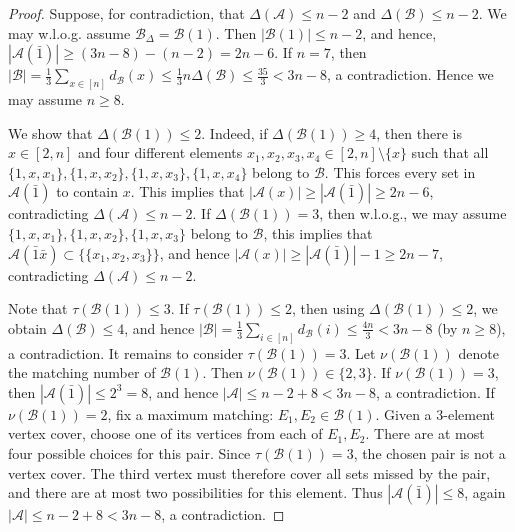 \documentclass[a4paper,11pt]{article}
\newcommand{\m}{\mathcal}
\begin{document}
\begin{proof}
Suppose, for contradiction, that $\Delta(\m A)\le n-2$ and $\Delta(\m B)\le n-2$.
We may w.l.o.g. assume $\m B_{\Delta}=\m B(1)$. Then $|\m B(1)|\le n-2$, and hence, $|\m A(\bar1)|\ge(3n-8)-(n-2)=2n-6.$ 
If $n=7$, then $|\m B|=\frac{1}{3}\sum_{x\in[n]}d_{\m B}(x)\le \frac{1}{3}n\Delta(\m B)\le \frac{35}{3}<3n-8$, a contradiction. Hence we may assume $n\ge8$. 

We show that $\Delta(\m B(1))\le 2$. Indeed, if $\Delta(\m B(1))\ge 4$, then  there is $x\in [2,n]$ and four different elements $x_1,x_2,x_3, x_4\in [2,n]\setminus \{x\}$ such that all $\{1,x,x_1\}, \{1,x,x_2\}, \{1,x,x_3\}, \{1,x,x_4\}$ belong to $\m B$. This forces every set in $\m A(\bar1)$ to contain $x$. This implies that $|\m A(x)|\ge|\m A(\bar1)|\ge 2n-6$, contradicting $\Delta(\m A)\le n-2$. If $\Delta(\m B(1))= 3$, then w.l.o.g., we may assume $\{1,x,x_1\}, \{1,x,x_2\}, \{1,x,x_3\}$ belong to $\m B$, this implies that $\m A(\bar1\bar x)\subset \{\{x_1,x_2,x_3\}\}$, and hence $|\m A(x)|\ge|\m A(\bar1)|-1\ge 2n-7$, contradicting $\Delta(\m A)\le n-2$.

Note that $\tau(\m B(1))\le 3$.
If $\tau(\m B(1))\le2$, then using $\Delta(\m B(1))\le 2$, we obtain $\Delta(\m B)\le 4$, and hence $|\m B|=\frac{1}{3}\sum_{i\in [n]}d_{\m B}(i)\le \frac{4n}{3}<3n-8$ (by $n\ge 8$), a contradiction. 
It remains to consider $\tau(\m B(1))=3$. Let $\nu(\m B(1))$ denote the matching
number of $\m B(1)$. Then $\nu(\m B(1))\in\{2,3\}.$
If $\nu(\m B(1))=3$, then $|\m A(\bar1)|\le 2^3=8$, and hence $|\m A|\le n-2+8<3n-8$, a contradiction. 
If $\nu(\m B(1))=2$, fix a maximum matching: $E_1,E_2\in \m B(1)$. Given a
$3$-element vertex cover, choose one of its vertices from each of
$E_1,E_2$. There are at most four possible choices for this pair.
Since $\tau(\m B(1))=3$, the chosen pair is not a vertex cover. The third
vertex must therefore cover all sets missed by the pair, and there
are at most two possibilities for this element. Thus $|\m A(\bar1)|\le 8$, again $|\m A|\le n-2+8<3n-8$, a contradiction. 
\end{proof}
\end{document}
